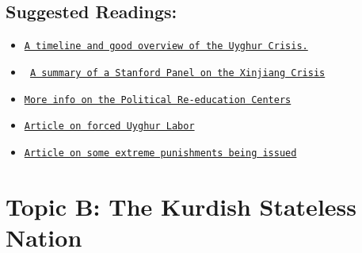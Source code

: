 \documentclass[10pt, letterpaper]{article}
\begin{document}
\subsection{Suggested Readings:}

\begin{itemize}
\item
  
  
  \texttt{\href{https://www.cfr.org/backgrounder/chinas-repression-uighurs-xinjiang}{{A timeline and good overview of the Uyghur Crisis.}}}
  
\item
  
  
 \texttt{ \href{https://fsi.stanford.edu/news/human-rights-crisis-xinjiang-uyghur-autonomous-region}{{A summary of a Stanford Panel on the Xinjiang Crisis}}}
  
\item
  
  
  \texttt{\href{https://thediplomat.com/2018/11/xinjiang-detention-camp-or-vocational-center-is-china-calling-a-deer-a-horse/}{{More info on the Political Re-education Centers}}}
  
\item
  
  \texttt{\href{https://www.nytimes.com/2020/07/19/world/asia/china-mask-forced-labor.html}{{Article on forced Uyghur Labor}}}
  
\item
  
  
  \texttt{\href{https://www.independent.co.uk/news/world/asia/china-re-education-muslims-ramadan-xinjiang-eat-pork-alcohol-communist-xi-jinping-a8357966.html}{Article on some extreme punishments being issued}}
  
\end{itemize}

\newpage
\section{{Topic B: The Kurdish Stateless Nation}}
\end{document}
